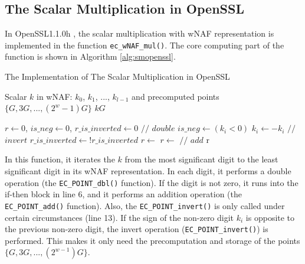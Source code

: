 %
\subsection{The Scalar Multiplication in OpenSSL}
\label{intro_smulinssl}
In OpenSSL1.1.0h \cite{openssl}, the scalar multiplication with wNAF representation is implemented in the function \verb+ec_wNAF_mul()+.
The core computing part of the function is shown in Algorithm  \ref{alg:smopenssl}.

\renewcommand{\algorithmicrequire}{\textbf{Input:}}
\renewcommand{\algorithmicensure}{\textbf{Output:}}

\begin{algorithm}[t]
        \caption{The Implementation of The Scalar Multiplication in OpenSSL}
        \label{alg:smopenssl}
        \begin{algorithmic}[1]
            \Require Scalar $k$ in wNAF: $k_0$, $k_1$, ..., $k_{l-1}$ and precomputed points $\{G, 3G, ..., (2^{w} - 1)G\}$
            \Ensure $kG$
			
			\State $r \gets 0$, $is\_neg \gets 0$, $r\_is\_inverted \gets 0$
            		\State {}     {   }  $//$ $double$
                \EndIf
                	\State $is\_neg \gets (k_i < 0)$
                		\State $k_i \gets -k_i$
                	\EndIf
                			\State {}   {   }  $//$ $invert$
                		\EndIf                	
                    	\State $r\_is\_inverted \gets !r\_is\_inverted$
                	\EndIf
                		\State $r \gets $ 
                	\Else
                		\State $r \gets $  {   }  $//$   $add$
                	\EndIf
                \EndIf
            \EndFor
            \State \Return r
        \end{algorithmic}
\end{algorithm}

In this function, it iterates the $k$ from the most significant digit to the least significant digit in its wNAF representation.
 In each digit, it performs a double operation (the \verb+EC_POINT_dbl()+ function).
  If the digit is not zero, it runs into the if-then block in line 6, and it  performs an addition operation (the \verb+EC_POINT_add()+ function).
Also, the \verb+EC_POINT_invert()+ is only called under certain circumstances (line 13).
If the sign of the non-zero digit $k_i$ is opposite to the previous  non-zero digit, the invert operation (\verb+EC_POINT_invert()+) is performed.
This makes it only need the precomputation and storage of the points $\{G, 3G, ..., (2^{w - 1})G\}$.

